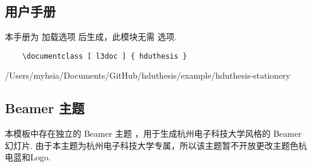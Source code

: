 \subsection{用户手册}

本手册为  加载选项  后生成，此模块无需  选项.

\begin{framed}
  \begin{verbatim}
    \documentclass [ l3doc ] { hduthesis }
  \end{verbatim}
\end{framed}


  {/Users/myhsia/Documents/GitHub/hduthesis/example/hduthesis-stationery}

\subsection{Beamer 主题}

本模板中存在独立的 Beamer 主题 ，用于生成杭州电子科技大学风格的 Beamer 幻灯片. 由于本主题为杭州电子科技大学专属，所以该主题暂不开放更改主题色杭电蓝和Logo.

\begin{center}
  \par
\end{center}
